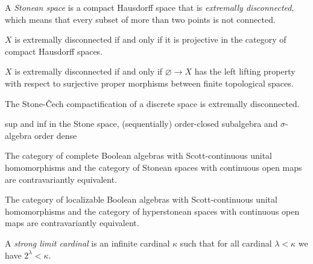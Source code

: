 \documentclass{../../large}
\begin{document}
\begin{prb}
A \emph{Stonean space} is a compact Hausdorff space that is \emph{extremally disconnected}, which means that every subset of more than two points is not connected.

\begin{parts}
\item $X$ is extremally disconnected if and only if it is projective in the category of compact Hausdorff spaces.
\item $X$ is extremally disconnected if and only if $\varnothing\to X$ has the left lifting property with respect to surjective proper morphisms between finite topological spaces.
\item The Stone-\v Cech compactification of a discrete space is extremally disconnected.
\end{parts}
\end{prb}


\begin{prb}
sup and inf in the Stone space,
(sequentially) order-closed subalgebra and $\sigma$-algebra
order dense
\begin{parts}
\item The category of complete Boolean algebras with Scott-continuous unital homomorphisms and the category of Stonean spaces with continuous open maps are contravariantly equivalent.
\end{parts}
\end{prb}





\begin{prb}
\begin{parts}
\item The category of localizable Boolean algebras with Scott-continuous unital homomorphisms and the category of hyperstonean spaces with continuous open maps are contravariantly equivalent.
\end{parts}
\end{prb}


\begin{prb}
A \emph{strong limit cardinal} is an infinite cardinal $\kappa$ such that for all cardinal $\lambda<\kappa$ we have $2^\lambda<\kappa$.
\end{prb}
\end{document}
